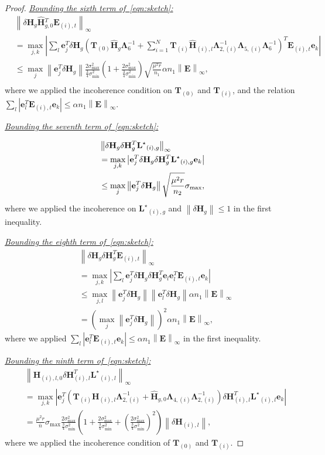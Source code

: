 \documentclass[twoside,11pt]{article}
\newcommand{\abs}[1]{\left\vert #1\right\vert}
\newcommand{\norm}[1]{\left\lVert#1\right\rVert}
\newcommand{\matE}{\mathbf{E}}
\newcommand{\matH}{\mathbf{H}}
\newcommand{\hmatH}{{\hat{\mathbf{H}}}{}}
\newcommand{\matLst}{{\mathbf{L}^\star}}
\newcommand{\matT}{\mathbf{T}}
\newcommand{\matLambda}{\mathbf{\Lambda}}
\newcommand{\dtmatH}{\delta\mathbf{H}}
\newcommand{\vece}{\mathbf{e}}
\newcommand{\gop}{\sigma_{\max}}
\newcommand{\B}{\norm{\matE}_{\infty}}
\newcommand{\murntwo}{\frac{\mu^2 r}{n_2}}
\newcommand{\murnb}{\frac{\mu^2 r}{\overline{n}}}
\newcommand{\sms}{\sigma_{\min}^2}
\newcommand{\tkappa}{\frac{2\gop^2}{\frac{3}{4}\sms}}
\newcommand{\hgzerodef}{\matT_{(0)}\hmatH_g\matLambda_6^{-1}+\sum_{i=1}^N\matT_{(i)}\hmatH_{(i),l}\matLambda_{2,(i)}^{-1}\matLambda_{5,(i)}\matLambda_6^{-1}}
\newcommand{\hilzerodef}{\matT_{(i)}\matH_{(i),l}\matLambda_{2,(i)}^{-1}+\hmatH_{g,0}\matLambda_{4,(i)}\matLambda_{2,(i)}^{-1}}
\begin{document}
\begin{proof}
\noindent\underline{\it Bounding the sixth term of~\eqref{eqn:sketch}:}
\begin{align*}
&\norm{\dtmatH_g\hmatH_{g,0}^T\matE_{(i),t}}_{\infty}\\
&=\max_{j,k}\abs{\sum_l\vece_j^T\dtmatH_g\left(\hgzerodef\right)^T\matE_{(i),t}\vece_k}\\
&\le \max_j\norm{\vece_j^T\dtmatH_g}\tkappa\left(1+\tkappa\right)\sqrt{\frac{\mu^2 r}{n_1}}\alpha n_1\B,\\
\end{align*}
where we applied the incoherence condition on $\matT_{(0)}$ and $\matT_{(i)}$, and the relation $\sum_l\abs{\vece_l^T\matE_{(i),t}\vece_k}\le \alpha n_1\B$.

\noindent\underline{\it Bounding the seventh term of~\eqref{eqn:sketch}:}

\begin{align}
\label{eqn:seventhterm}
&\norm{\dtmatH_g\dtmatH_g^T\matLst_{(i),g}}_{\infty}\notag\\
&=\max_{j,k}\abs{\vece_j^T\dtmatH_g\dtmatH_g^T\matLst_{(i),g}\vece_k}\notag\\
&\le \max_{j}\norm{\vece_j^T\dtmatH_g}\sqrt{\murntwo}\gop,\notag\\
\end{align}
where we applied the incoherence on $\matLst_{(i),g}$ and $\norm{\dtmatH_g}\le 1$ in the first inequality.

\noindent\underline{\it Bounding the eighth term of~\eqref{eqn:sketch}:}
\begin{align*}
&\norm{\dtmatH_g\dtmatH_g^T\matE_{(i),t}}_{\infty}\\
&=\max_{j,k}\abs{\sum_l\vece_j^T\dtmatH_g\dtmatH_g^T\vece_l\vece_l^T\matE_{(i),t}\vece_k}\\
&\le \max_{j,l}\norm{\vece_j^T\dtmatH_g}\norm{\vece_l^T\dtmatH_g}\alpha n_1\B\\
&=\left(\max_{j}\norm{\vece_j^T\dtmatH_g}\right)^2\alpha n_1\B,
\end{align*}
where we applied $\sum_l\abs{\vece_l^T\matE_{(i),t}\vece_k}\le \alpha n_1 \B$ in the first inequality.

\noindent\underline{\it Bounding the ninth term of~\eqref{eqn:sketch}:}
\begin{align*}
&\norm{\hmatH_{(i),l,0}\dtmatH_{(i),l}^T\matLst_{(i),l}}_{\infty}\\
&=\max_{j,k}\abs{\vece_j^T\left(\hilzerodef\right)\dtmatH_{(i),l}^T\matLst_{(i),l}\vece_k}\\
&=\murnb\gop\tkappa\left(1+\tkappa+\left(\tkappa\right)^2\right)\norm{\dtmatH_{(i),l}},
\end{align*}
where we applied the incoherence condition of $\matT_{(0)}$ and $\matT_{(i)}$.


\end{proof}
\end{document}
